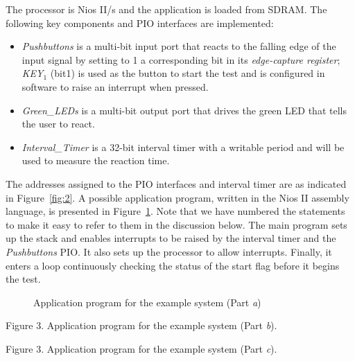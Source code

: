 \documentclass[11pt, twoside, pdftex]{article}
\begin{document}
The processor is Nios II/s and the application is loaded from SDRAM.
The following key components and PIO interfaces are implemented:
\begin{itemize}
\item {\it Pushbuttons} is a multi-bit input port that reacts to the falling edge of the
input signal by setting to 1 a corresponding bit in its {\it edge-capture register}; 
{\it KEY}$_1$ (bit1) is used as the button to start the test and is configured in software to raise an interrupt when pressed.
\item {\it Green\_LEDs} is a multi-bit output port that drives the green LED
that tells the user to react.
\item {\it Interval\_Timer} is a 32-bit interval timer with a writable period and will be used to measure the reaction time.
\end{itemize}
\noindent
The addresses assigned to the PIO interfaces and interval timer are as indicated in Figure~\ref{fig:2}. A possible application program, written in the Nios II assembly language,
is presented in Figure~\ref{fig:3}. Note that we have numbered the 
statements to make it easy to refer to them in the discussion below.
The main program sets up the stack and enables interrupts to be raised by the interval timer and the {\it Pushbuttons} PIO. It also sets up the processor to allow interrupts. Finally, it enters 
a loop continuously checking the status of the start flag before it begins the test.
%
\begin{figure}[H]
\begin{center}

	\caption{Application program for the example system (Part {\it a})}
	\label{fig:3}
\end{center}
\end{figure}
\newpage
\begin{center}

Figure 3.  Application program for the example system (Part {\it b}).
\end{center}

\begin{center}

Figure 3.  Application program for the example system (Part {\it c}).\\
\end{center}
\end{document}
